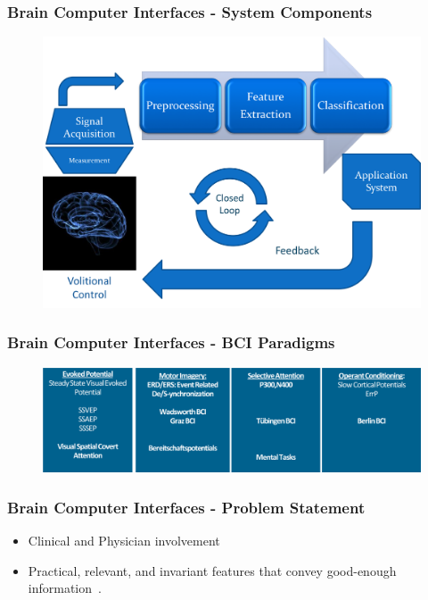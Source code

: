 \documentclass[aspectratio=169]{beamer}
\newcommand\Fontre{\fontsize{16}{16.2}\selectfont}
\begin{document}
\begin{frame}
\frametitle{Brain Computer Interfaces - System Components}
\begin{center}
\begin{figure}[]
\centering
\includegraphics[scale=0.4]{images/bcichart.png}
\label{fig:bciblockdiagram}
\end{figure}
\end{center}
\end{frame}

\begin{frame}   
\frametitle{Brain Computer Interfaces - BCI Paradigms}
\begin{figure}[]
\centering
\includegraphics[scale=0.5]{images/BCIParadigms.png}
\label{fig:digitalelectroencephalograph}
\end{figure}
\end{frame}   
    

    \begin{frame}
        \frametitle{Brain Computer Interfaces - Problem Statement}
        \begin{center}
            \begin{itemize}
                \item<1-> \Fontre Clinical and Physician involvement~
                \item<2-> \Fontre Practical, relevant, and invariant features that convey good-enough information~.
            \end{itemize}
        \end{center}
    \end{frame} 
    
\end{document}
